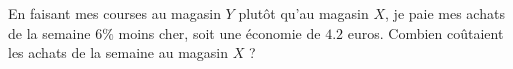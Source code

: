 
\begin{exercice}\label{exosmath-0120}

    En faisant mes courses au magasin \( Y\) plutôt qu'au magasin \( X\), je paie mes achats de la semaine \( 6\%\) moins cher, soit une économie de \( 4.2\) euros. Combien coûtaient les achats de la semaine au magasin \( X\) ?

\end{exercice}
